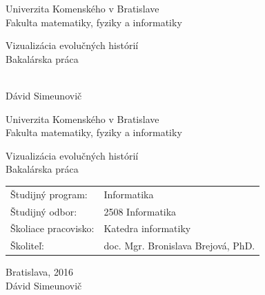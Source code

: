 \documentclass[12pt,oneside]{book}
\def\program{ Informatika }
\def\mfrok{2016}
\def\mfnazov{Vizualizácia evolučných histórií}
\def\mftyp{Bakalárska práca}
\def\mfautor{Dávid Simeunovič}
\def\mfskolitel{doc. Mgr. Bronislava Brejová, PhD.}
\def\mfkonzultant{tit. Meno Priezvisko, tit. }
\def\mfmiesto{Bratislava, \mfrok}
\def\mfodbor{2508 Informatika}
\def\program{ Informatika }
\def\mfpracovisko{ Katedra informatiky }
\begin{document}
     

\thispagestyle{empty}

\begin{center}
\sc\large
Univerzita Komenského v Bratislave\\
Fakulta matematiky, fyziky a informatiky

\vfill

{\LARGE\mfnazov}\\
\mftyp
\end{center}

\vfill

{\sc\large 
\noindent \mfrok\\
\mfautor
}

\eject %


\thispagestyle{empty}
\noindent

\begin{center}
\sc  
\large
Univerzita Komenského v Bratislave\\
Fakulta matematiky, fyziky a informatiky

\vfill

{\LARGE\mfnazov}\\
\mftyp
\end{center}

\vfill

\noindent
\begin{tabular}{ll}
Študijný program: & \program \\
Študijný odbor: & \mfodbor \\
Školiace pracovisko: & \mfpracovisko \\
Školiteľ: & \mfskolitel \\
\end{tabular}

\vfill


\noindent \mfmiesto\\
\mfautor

\eject %




\end{document}

